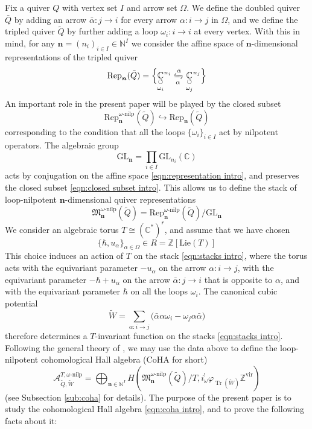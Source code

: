 \documentclass{amsart}
\def\GL{\mathrm{GL}}
\def\BC{{\mathbb{C}}}
\def\BZ{{\mathbb{Z}}}
\DeclareMathOperator{\Tr}{\mathrm{Tr}}
\def\vir{\mathrm{vir}}
\def\nn{{\mathbb{N}^I}}
\def\bn{{\boldsymbol{n}}}
\def\edge{\Omega}
\def\dalpha{\bar{\alpha}}
\def\tQ{\tilde{Q}}
\def\tW{\tilde{W}}
\def\ring{R}
\def\kha{\mathcal{A}^{T,\omega\text{-nilp}}_{\tQ,\tW}}
\begin{document}
Fix a quiver $Q$ with vertex set $I$ and arrow set $\edge$. We define the doubled quiver $\bar{Q}$ by adding an arrow $\dalpha : j \rightarrow i$ for every arrow $\alpha : i \rightarrow j$ in $\edge$, and we define the tripled quiver $\tQ$ by further adding a loop $\omega_i : i \rightarrow i$ at every vertex. With this in mind, for any $\bn = (n_i)_{i \in I} \in \nn$ we consider the affine space of $\bn$-dimensional representations of the tripled quiver
\begin{equation}
\label{eqn:representation intro}
\text{Rep}_{\bn}(\tQ) = \Big\{\underset{\omega_i}{\underset{\circlearrowleft}{\BC}}^{n_i} \xleftrightharpoons[\alpha]{\dalpha} \underset{\omega_j}{\underset{\circlearrowleft}{\BC}}^{n_j}\Big\}
\end{equation}
An important role in the present paper will be played by the closed subset
\begin{equation}
\label{eqn:closed subset intro}
\text{Rep}^{\omega\text{-nilp}}_{\bn}(\tQ) \hookrightarrow \text{Rep}_{\bn}(\tQ) 
\end{equation}
corresponding to the condition that all the loops $\{\omega_i\}_{i \in I}$ act by nilpotent operators. The algebraic group
$$
\GL_{\bn} = \prod_{i \in I} \GL_{n_i}(\BC)
$$ 
acts by conjugation on the affine space \eqref{eqn:representation intro}, and preserves the closed subset \eqref{eqn:closed subset intro}. This allows us to define the stack of loop-nilpotent $\bn$-dimensional quiver representations
\begin{equation}
\label{eqn:stacks intro}
\mathfrak{M}^{\omega\text{-nilp}}_{\bn}(\tQ) = \mathrm{Rep}^{\omega\text{-nilp}}_{\bn}(\tQ)/\GL_{\bn}
\end{equation}
We consider an algebraic torus $T \cong (\BC^*)^r$, and assume that we have chosen
\begin{equation}
\label{eqn:parameters intro}
\{\hbar, u_\alpha\}_{\alpha \in \edge} \in \ring = \BZ[\text{Lie}(T)]
\end{equation}
This choice induces an action of $T$ on the stack \eqref{eqn:stacks intro}, where the torus acts with the equivariant parameter $-u_\alpha$ on the arrow $\alpha : i \rightarrow j$, with the equivariant parameter $-\hbar + u_\alpha$ on the arrow $\dalpha : j \rightarrow i$ that is opposite to $\alpha$, and with the equivariant parameter $\hbar$ on all the loops $\omega_i$. The canonical cubic potential 
$$
\tW = \sum_{\alpha : i \rightarrow j} \Big( \dalpha \alpha \omega_i - \omega_j \alpha \dalpha \Big)
$$
therefore determines a $T$-invariant function on the stacks \eqref{eqn:stacks intro}. Following the general theory of \cite{KS}, we may use the data above to define the loop-nilpotent cohomological Hall algebra (CoHA for short)
\begin{equation}
\label{eqn:coha intro}
\kha = \bigoplus_{\bn \in \mathbb{N}^{I}}  H(\mathfrak{M}^{\omega\text{-nilp}}_{\bn}(\tilde{Q})/T, i^{!}_{\omega}\varphi_{\Tr(\tW)}\mathbb{Z}^{\vir}_{} )
\end{equation}
(see Subsection \ref{sub:coha} for details).   The purpose of the present paper is to study the cohomological Hall algebra \eqref{eqn:coha intro}, and to prove the following facts about it:
\end{document}
